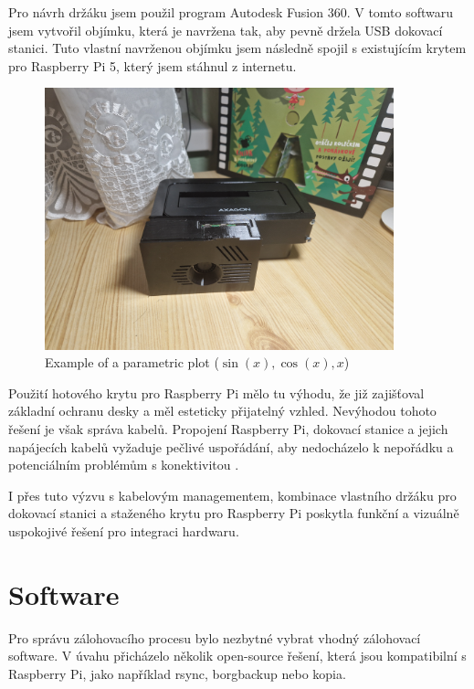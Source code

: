 \documentclass[a4paper,12pt, oneside]{book}
\begin{document}
Pro návrh držáku jsem použil program Autodesk Fusion 360. V tomto softwaru jsem
vytvořil objímku, která je navržena tak, aby pevně držela USB dokovací stanici.
Tuto vlastní navrženou objímku jsem následně spojil s existujícím krytem pro
Raspberry Pi 5, který jsem stáhnul z internetu. 

\begin{figure}[h]
\caption{Example of a parametric plot ($\sin (x), \cos(x), x$)}
\centering
\includegraphics[width=0.9\textwidth]{img/skladani4.jpg}
\end{figure}

Použití hotového krytu pro Raspberry Pi mělo tu výhodu, že již zajišťoval
základní ochranu desky a měl esteticky přijatelný vzhled. Nevýhodou tohoto
řešení je však správa kabelů. Propojení Raspberry Pi, dokovací stanice a jejich
napájecích kabelů vyžaduje pečlivé uspořádání, aby nedocházelo k nepořádku a
potenciálním problémům s konektivitou . 

I přes tuto výzvu s kabelovým managementem, kombinace vlastního
držáku pro dokovací stanici a staženého krytu pro Raspberry Pi poskytla funkční
a vizuálně uspokojivé řešení pro integraci hardwaru.


\chapter{Software}

Pro správu zálohovacího procesu bylo nezbytné vybrat vhodný zálohovací software.
V úvahu přicházelo několik open-source řešení, která jsou kompatibilní s
Raspberry Pi, jako například rsync, borgbackup nebo kopia.
\end{document}
